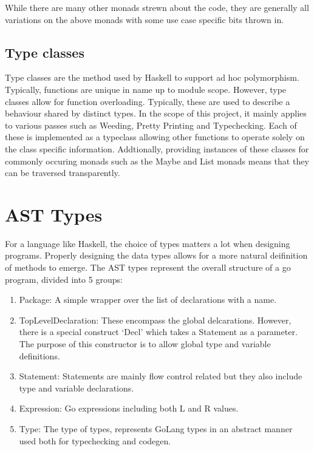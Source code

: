 \documentclass[11pt]{article}
\begin{document}
While there are many other monads strewn about the code, they are generally all variations on the above monads with some use case specific bits thrown in. 

\subsection{Type classes}

Type classes are the method used by Haskell to support ad hoc polymorphism. Typically, functions are unique in name up to module scope. However, type classes allow for function overloading. Typically, these are used to describe a behaviour shared by distinct types. In the scope of this project, it mainly applies to various passes such as Weeding, Pretty Printing and Typechecking. Each of these is implemented as a typeclass allowing other functions to operate solely on the class specific information. Addtionally, providing instances of these classes for commonly occuring monads such as the Maybe and List monads means that they can be traversed transparently. 

\section{AST Types}

For a language like Haskell, the choice of types matters a lot when designing programs. Properly designing the data types allows for a more natural deifinition of methods to emerge. The AST types represent the overall structure of a go program, divided into 5 groups:

\begin{enumerate}
\item Package: A simple wrapper over the list of declarations with a name. 
\item TopLevelDeclaration: These encompass the global delcarations. However, there is a special construct `Decl' which takes a Statement as a parameter. The purpose of this constructor is to allow global type and variable definitions. 
\item Statement: Statements are mainly flow control related but they also include type and variable declarations.
\item Expression: Go expressions including both L and R values.
\item Type: The type of types, represents GoLang types in an abstract manner used both for typechecking and codegen.
\end{enumerate}
\end{document}
